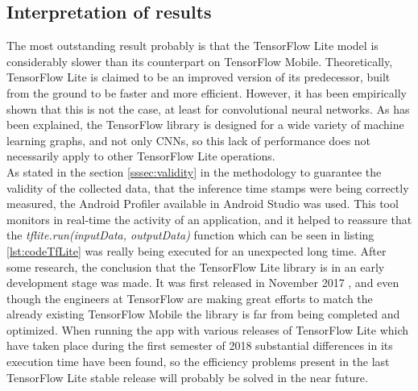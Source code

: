 \subsection{Interpretation of results}
The most outstanding result probably is that the TensorFlow Lite model is considerably slower than its counterpart on TensorFlow Mobile. Theoretically, TensorFlow Lite is claimed to be an improved version of its predecessor, built from the ground to be faster and more efficient. However, it has been empirically shown that this is not the case, at least for convolutional neural networks. As has been explained, the TensorFlow library is designed for a wide variety of machine learning graphs, and not only CNNs, so this lack of performance does not necessarily apply to other TensorFlow Lite operations. \\

As stated in the section \ref{sssec:validity} in the methodology to guarantee the validity of the collected data, that the inference time stamps were being correctly measured, the Android Profiler available in Android Studio was used. This tool monitors in real-time the activity of an application, and it helped to reassure that the \textit{tflite.run(inputData, outputData)} function which can be seen in listing \ref{lst:codeTfLite} was really being executed for an unexpected long time. After some research, the conclusion that the TensorFlow Lite library is in an early development stage was made. It was first released in November 2017 \cite{techcrunch}, and even though the engineers at TensorFlow are making great efforts to match the already existing TensorFlow Mobile the library is far from being completed and optimized. When running the app with various releases of TensorFlow Lite which have taken place during the first semester of 2018 substantial differences in its execution time have been found, so the efficiency problems present in the last TensorFlow Lite stable release will probably be solved in the near future. \\

